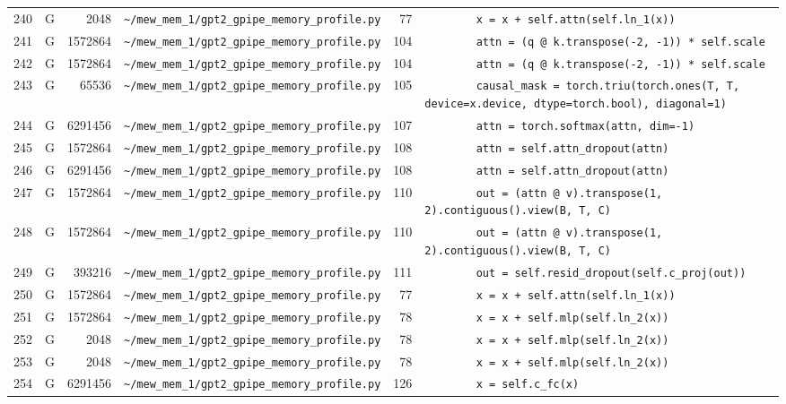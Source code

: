\documentclass{article}
\begin{document}
\begin{longtable}{r l r p{6.5cm} r p{7.0cm}}
240 & G & 2048 & \lstinline|~/mew_mem_1/gpt2_gpipe_memory_profile.py| & 77 & \lstinline|        x = x + self.attn(self.ln_1(x))| \\
241 & G & 1572864 & \lstinline|~/mew_mem_1/gpt2_gpipe_memory_profile.py| & 104 & \lstinline|        attn = (q @ k.transpose(-2, -1)) * self.scale| \\
242 & G & 1572864 & \lstinline|~/mew_mem_1/gpt2_gpipe_memory_profile.py| & 104 & \lstinline|        attn = (q @ k.transpose(-2, -1)) * self.scale| \\
243 & G & 65536 & \lstinline|~/mew_mem_1/gpt2_gpipe_memory_profile.py| & 105 & \lstinline|        causal_mask = torch.triu(torch.ones(T, T, device=x.device, dtype=torch.bool), diagonal=1)| \\
244 & G & 6291456 & \lstinline|~/mew_mem_1/gpt2_gpipe_memory_profile.py| & 107 & \lstinline|        attn = torch.softmax(attn, dim=-1)| \\
245 & G & 1572864 & \lstinline|~/mew_mem_1/gpt2_gpipe_memory_profile.py| & 108 & \lstinline|        attn = self.attn_dropout(attn)| \\
246 & G & 6291456 & \lstinline|~/mew_mem_1/gpt2_gpipe_memory_profile.py| & 108 & \lstinline|        attn = self.attn_dropout(attn)| \\
247 & G & 1572864 & \lstinline|~/mew_mem_1/gpt2_gpipe_memory_profile.py| & 110 & \lstinline|        out = (attn @ v).transpose(1, 2).contiguous().view(B, T, C)| \\
248 & G & 1572864 & \lstinline|~/mew_mem_1/gpt2_gpipe_memory_profile.py| & 110 & \lstinline|        out = (attn @ v).transpose(1, 2).contiguous().view(B, T, C)| \\
249 & G & 393216 & \lstinline|~/mew_mem_1/gpt2_gpipe_memory_profile.py| & 111 & \lstinline|        out = self.resid_dropout(self.c_proj(out))| \\
250 & G & 1572864 & \lstinline|~/mew_mem_1/gpt2_gpipe_memory_profile.py| & 77 & \lstinline|        x = x + self.attn(self.ln_1(x))| \\
251 & G & 1572864 & \lstinline|~/mew_mem_1/gpt2_gpipe_memory_profile.py| & 78 & \lstinline|        x = x + self.mlp(self.ln_2(x))| \\
252 & G & 2048 & \lstinline|~/mew_mem_1/gpt2_gpipe_memory_profile.py| & 78 & \lstinline|        x = x + self.mlp(self.ln_2(x))| \\
253 & G & 2048 & \lstinline|~/mew_mem_1/gpt2_gpipe_memory_profile.py| & 78 & \lstinline|        x = x + self.mlp(self.ln_2(x))| \\
254 & G & 6291456 & \lstinline|~/mew_mem_1/gpt2_gpipe_memory_profile.py| & 126 & \lstinline|        x = self.c_fc(x)| \\

\end{longtable}
\end{document}
